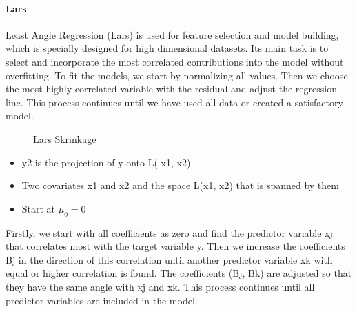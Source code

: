 \paragraph{Lars}

Least Angle Regression (Lars) is used for feature selection and model building, which is specially designed for high dimensional datasets. Its main task is to select and incorporate the most correlated contributions into the model without overfitting. To fit the models, we start by normalizing all values. Then we choose the most highly correlated variable with the residual and adjust the regression line. This process continues until we have used all data or created a satisfactory model. 


\begin{figure}[h]
\centering
\caption{Lars Skrinkage} \label{fig:lars}
\end{figure}

\begin{itemize}
    \item y2 is the projection of  y onto L( x1, x2) 
    \item Two covariates x1 and x2 and the space L(x1, x2) that is spanned by them 
    \item Start at \(\mu_{0} = 0\)
\end{itemize}

Firstly, we start with all coefficients as zero and find the predictor variable xj that correlates most with the target variable y. Then we increase the coefficients Bj in the direction of this correlation until another predictor variable xk with equal or higher correlation is found. The coefficients (Bj, Bk) are adjusted so that they have the same angle with xj and xk. This process continues until all predictor variables are included in the model. 

